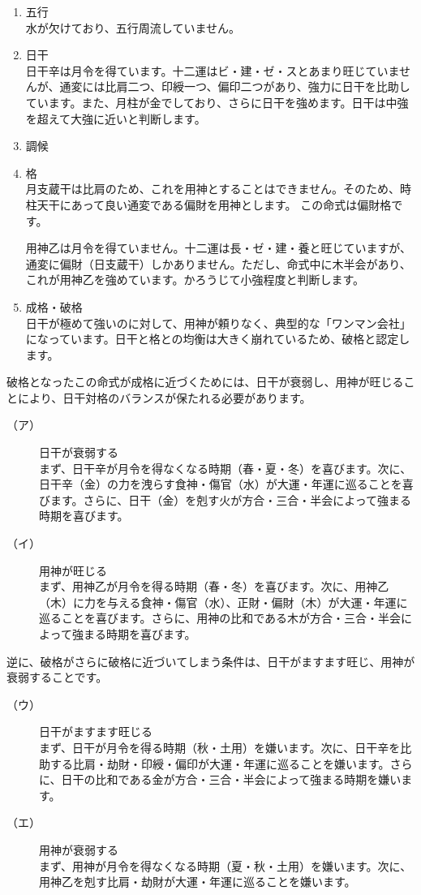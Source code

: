 \documentclass[a5paper,11pt,dvipdfmx]{tarticle}
\begin{document}
\begin{enumerate}
\item 五行\\
水が欠けており、五行周流していません。
\item 日干\\
  日干辛は月令を得ています。十二運はビ・建・ゼ・スとあまり旺じていませんが、通変には比肩二つ、印綬一つ、偏印二つがあり、強力に日干を比助しています。また、月柱が金でしており、さらに日干を強めます。日干は中強を超えて大強に近いと判断します。
  
\item 調候\\

\item 格\\
月支蔵干は比肩のため、これを用神とすることはできません。そのため、時柱天干にあって良い通変である偏財を用神とします。
この命式は偏財格です。

用神乙は月令を得ていません。十二運は長・ゼ・建・養と旺じていますが、通変に偏財（日支蔵干）しかありません。ただし、命式中に木半会があり、これが用神乙を強めています。かろうじて小強程度と判断します。
\item 成格・破格\\
日干が極めて強いのに対して、用神が頼りなく、典型的な「ワンマン会社」になっています。日干と格との均衡は大きく崩れているため、破格と認定します。\\
\end{enumerate}


破格となったこの命式が成格に近づくためには、日干が衰弱し、用神が旺じることにより、日干対格のバランスが保たれる必要があります。
\begin{description}
\item[（ア）] 日干が衰弱する\\
まず、日干辛が月令を得なくなる時期（春・夏・冬）を喜びます。次に、日干辛（金）の力を洩らす食神・傷官（水）が大運・年運に巡ることを喜びます。さらに、日干（金）を剋す火が方合・三合・半会によって強まる時期を喜びます。
\item[（イ）] 用神が旺じる\\
まず、用神乙が月令を得る時期（春・冬）を喜びます。次に、用神乙（木）に力を与える食神・傷官（水）、正財・偏財（木）が大運・年運に巡ることを喜びます。さらに、用神の比和である木が方合・三合・半会によって強まる時期を喜びます。
\end{description}

逆に、破格がさらに破格に近づいてしまう条件は、日干がますます旺じ、用神が衰弱することです。
\begin{description}
\item[（ウ）] 日干がますます旺じる\\
まず、日干が月令を得る時期（秋・土用）を嫌います。次に、日干辛を比助する比肩・劫財・印綬・偏印が大運・年運に巡ることを嫌います。さらに、日干の比和である金が方合・三合・半会によって強まる時期を嫌います。
\item[（エ）] 用神が衰弱する\\
まず、用神が月令を得なくなる時期（夏・秋・土用）を嫌います。次に、用神乙を剋す比肩・劫財が大運・年運に巡ることを嫌います。
\end{description}
\end{document}
